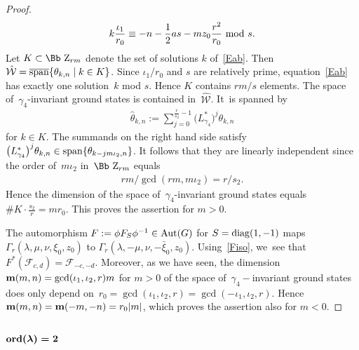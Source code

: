 \documentclass[pdftex]{sigma}
\newcommand\ZZ{{\mbox{\Bb Z}}}
\newcommand\bm{\textbf{{\rm \textbf{m}}}}
\newcommand\cW{{\mathcal W}}
\newcommand\cF{{\mathcal F}}
\newcommand{\Aut}{\mathop{{\rm Aut}}}
\newcommand{\diag}{\mathop{{\rm diag}}}
\newcommand{\Span}{\mathop{{\rm span}}}
\newcommand{\cSpan}{{\overline{\rm span}}}
\newcommand{\ord}{{\rm ord}}
\numberwithin{equation}{section}
\begin{document}
\begin{proof}
\begin{gather}\label{Eab}
 k\frac {\iota_1}{r_0}\equiv -n-\frac12 as-mz_0\frac{r^2}{r_0} \ {\rm mod}\ s.
\end{gather}
Let $K\subset\ZZ_{rm}$ denote the set of solutions $k$ of~\eqref{Eab}. Then $\hat\cW=\cSpan\{\theta_{k,n}\mid k\in K\}$. Since $\iota_1/r_0$ and $s$ are relatively prime, equation~\eqref{Eab} has exactly one solution~$k$ mod $s$. Hence $K$ contains $rm/s$ elements. The space of~$\gamma_4$-invariant ground states is contained in~$\hat\cW$. It~is spanned by
\begin{gather*}
\hat \theta_{k,n}:=\sum_{j=0}^{\frac r{s_2}-1}\big(L_{\gamma_4}^*\big)^{j}\theta_{k,n}
\end{gather*}
for $k\in K$. The summands on the right hand side satisfy $\big(L_{\gamma_4}^*\big)^{j}\theta_{k,n}\in\Span\{\theta_{k-jm\iota_2,n}\}$. It follows that they are linearly independent since the order of~$m\iota_2$ in~$\ZZ_{rm}$ equals
\begin{gather*}
rm/\gcd(rm,m\iota_2)=r/s_2.
\end{gather*}
Hence the dimension of the space of~$\gamma_4$-invariant ground states equals $\# K \cdot \frac {s_2}r=m r_0$. This proves the assertion for $m>0$.

The automorphism $F:=\phi F_{S}\phi^{-1}\in \Aut(G)$ for $S=\diag(1,-1)$ maps $\Gamma_r(\lambda,\mu,\nu,\xi_0,z_0)$ to $\Gamma_r(\lambda,-\mu,\nu,-\bar\xi_0,z_0)$. Using~\eqref{Fiso}, we~see that $F^*(\cF_{c,d})=\cF_{-c,-d}$. Moreover, as we have seen, the dimension~$\bm(m,n)=\gcd(\iota_1,\iota_2,r) m$ for $m>0$ of the space of~$\gamma_4-$invariant ground states does only depend on~$r_0=\gcd(\iota_1,\iota_2,r)=\gcd(-\iota_1,\iota_2,r)$. Hence $\bm(m,n)=\bm(-m,-n)=r_0|m|$, which proves the assertion also for $m<0$.
\end{proof}

\subsubsection[$\ord(\lambda)=2$]{$\boldsymbol{\ord(\lambda)=2}$}
\end{document}
